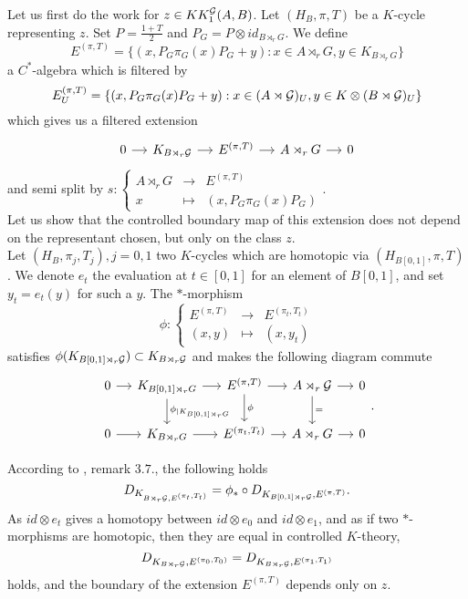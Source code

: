 Let us first do the work for $z\in KK_1^\mathcal G(A,B)$. Let $(H_B,\pi,T)$ be a $K$-cycle representing $z$. Set $P=\frac{1+T}{2}$ and $P_G=P\otimes id_{B\rtimes_r G}$. We define
\[E^{(\pi,T)}=\{(x,P_G\pi_G(x)P_G + y) : x\in A\rtimes_r G, y\in K_{B\rtimes_r G}\}\]
a $C^*$-algebra which is filtered by
\[E_U^{(\pi,T)}=\{(x,P_G\pi_G(x)P_G + y) : x\in (A\rtimes \mathcal G)_U, y\in K\otimes (B\rtimes\mathcal G)_U\}\]
which gives us a filtered extension
\[\begin{tikzcd}[column sep = small]
0\arrow{r} & K_{B\rtimes_r\G}\arrow{r} & E^{(\pi,T)} \arrow{r} & A\rtimes_r G \arrow{r}& 0
\end{tikzcd}\]
and semi split by  $s :\left\{\begin{array}{lll}A\rtimes_r G & \rightarrow & E^{(\pi,T)} \\ x & \mapsto & (x, P_G \pi_G(x)P_G)\end{array}\right.$.\\

Let us show that the controlled boundary map of this extension does not depend on the representant chosen, but only on the class $z$.\\
Let $(H_B, \pi_j,T_j), j=0,1$ two $K$-cycles which are homotopic via $(H_{B[0,1]},\pi,T)$. We denote $e_t$ the evaluation at $t\in[0,1]$ for an element of $B[0,1]$, and set $y_t=e_t(y)$ for such a $y$. The $*$-morphism
\[\phi : \left\{\begin{array}{lll}E^{(\pi,T)} & \rightarrow & E^{(\pi_t,T_t)} \\ (x,y) & \mapsto & (x, y_t)\end{array}\right.\]
satisfies $\phi(K_{B[0,1] \rtimes_r \mathcal G})\subset K_{B \rtimes_r \mathcal G}$ and makes the following diagram commute
\[\begin{tikzcd}[column sep = small]
0\arrow{r} & K_{B[0,1] \rtimes_r G}\arrow{r}\arrow{d}{\phi_{|K_{B[0,1] \rtimes_r G}}} & E^{(\pi,T)} \arrow{r}\arrow{d}{\phi} & A\rtimes_r \G \arrow{r}\arrow{d}{=}& 0 \\
0\arrow{r} & K_{B \rtimes_r G}\arrow{r} &  E^{(\pi_t,T_t)} \arrow{r} & A\rtimes_r G \arrow{r} & 0
\end{tikzcd}.\]

According to \cite{OY2}, remark $3.7.$, the following holds
\[D_{K_{B\rtimes_r\mathcal G,E^{(\pi_t,T_t)}}} = \phi_* \circ D_{K_{B[0,1]\rtimes_r\mathcal G},E^{(\pi,T)}}.\]
As $id \otimes e_t$ gives a homotopy between $id\otimes e_0$ and $id\otimes e_1$, and as if two $*$-morphisms are homotopic, then they are equal in controlled $K$-theory, 
\[D_{K_{B\rtimes_r \mathcal G}, E^{(\pi_0,T_0)}}=D_{K_{B\rtimes_r \mathcal G}, E^{(\pi_1,T_1)}}\]
holds, and the boundary of the extension $E^{(\pi,T)}$ depends only on $z$.\\

